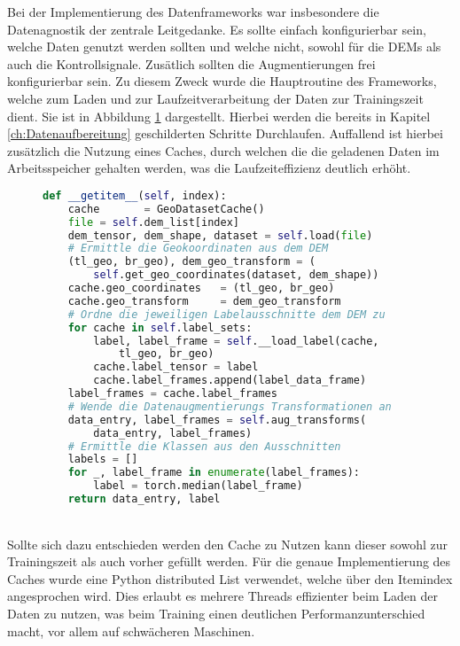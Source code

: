 Bei der Implementierung des Datenframeworks war insbesondere die Datenagnostik der zentrale Leitgedanke. Es sollte einfach konfigurierbar sein, welche Daten genutzt werden sollten und welche nicht, sowohl für die DEMs als auch die Kontrollsignale. Zusätlich sollten die Augmentierungen frei konfigurierbar
sein. Zu diesem Zweck wurde die Hauptroutine des Frameworks, welche zum Laden und zur Laufzeitverarbeitung der Daten zur Trainingszeit dient. Sie ist in Abbildung \ref{fig:Data_runtime} dargestellt. Hierbei werden die bereits in Kapitel \ref{ch:Datenaufbereitung} geschilderten Schritte Durchlaufen. Auffallend ist hierbei zusätzlich die Nutzung eines Caches, durch welchen die die geladenen Daten im Arbeitsspeicher gehalten werden, was die Laufzeiteffizienz deutlich erhöht.
\begin{figure}[htbp]
\begin{lstlisting}[language=python]
def __getitem__(self, index):
    cache       = GeoDatasetCache()
    file = self.dem_list[index]
    dem_tensor, dem_shape, dataset = self.load(file)  
    # Ermittle die Geokoordinaten aus dem DEM
    (tl_geo, br_geo), dem_geo_transform = (
        self.get_geo_coordinates(dataset, dem_shape))    
    cache.geo_coordinates   = (tl_geo, br_geo)
    cache.geo_transform     = dem_geo_transform
    # Ordne die jeweiligen Labelausschnitte dem DEM zu 
    for cache in self.label_sets:
        label, label_frame = self.__load_label(cache, 
            tl_geo, br_geo)
        cache.label_tensor = label
        cache.label_frames.append(label_data_frame)
    label_frames = cache.label_frames
    # Wende die Datenaugmentierungs Transformationen an 
    data_entry, label_frames = self.aug_transforms(
        data_entry, label_frames)
    # Ermittle die Klassen aus den Ausschnitten 
    labels = []
    for _, label_frame in enumerate(label_frames):
        label = torch.median(label_frame)
    return data_entry, label
\end{lstlisting}
    \captionsetup{type=figure}
    \label{fig:Data_runtime}
\end{figure} \\
Sollte sich dazu entschieden werden den Cache zu Nutzen kann dieser sowohl zur Trainingszeit als auch vorher gefüllt werden. Für die genaue Implementierung des Caches wurde eine Python distributed List verwendet, welche über den Itemindex angesprochen wird. Dies erlaubt es mehrere Threads effizienter beim Laden der Daten zu nutzen, was beim Training einen deutlichen Performanzunterschied macht, vor allem auf schwächeren Maschinen. 


